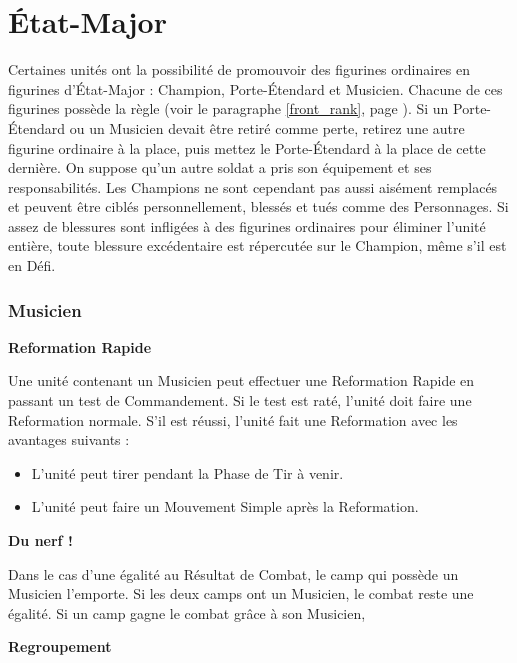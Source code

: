 
\part{État-Major}
\label{command_group}

Certaines unités ont la possibilité de promouvoir des figurines ordinaires en figurines d'État-Major : Champion, Porte-Étendard et Musicien. Chacune de ces figurines possède la règle \newfromWHB{\frontrank} (voir le paragraphe \ref{front_rank}, page \pageref{front_rank}). Si un Porte-Étendard ou un Musicien devait être retiré comme perte, retirez une autre figurine ordinaire à la place, puis mettez le Porte-Étendard à la place de cette dernière. On suppose qu'un autre soldat a pris son équipement et ses responsabilités. Les Champions ne sont cependant pas aussi aisément remplacés et peuvent être ciblés personnellement, blessés et tués comme des Personnages. Si assez de blessures sont infligées à des figurines ordinaires pour éliminer l'unité entière, toute blessure excédentaire est répercutée sur le Champion, même s'il est en Défi.

\section{Musicien}
\label{musician}

\noindent\textbf{Reformation Rapide}

Une unité contenant un Musicien peut effectuer une Reformation Rapide en passant un test de Commandement. Si le test est raté, l'unité doit faire une Reformation normale. S'il est réussi, l'unité fait une Reformation avec les avantages suivants :
\begin{itemize}[label={-}]
\item L'unité peut tirer pendant la Phase de Tir à venir.
\item L'unité peut faire un Mouvement Simple après la Reformation.
\end{itemize}

\noindent\textbf{Du nerf !}

Dans le cas d'une égalité au Résultat de Combat, le camp qui possède un Musicien l'emporte. Si les deux camps ont un Musicien, le combat reste une égalité. Si un camp gagne le combat grâce à son Musicien, 

\noindent\textbf{Regroupement}


